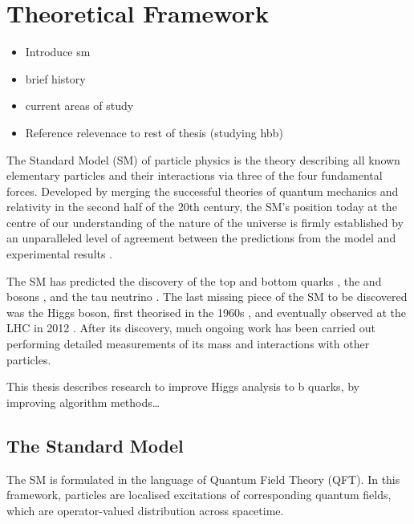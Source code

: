 \chapter{Theoretical Framework}\label{chap:theory}

\begin{itemize}
  \item Introduce sm
  \item brief history
  \item current areas of study
  \item Reference relevenace to rest of thesis (studying hbb)
\end{itemize}

The Standard Model (SM) of particle physics is the theory describing all known elementary particles and their interactions via three of the four fundamental forces.
Developed by merging the successful theories of quantum mechanics and relativity in the second half of the 20th century, the SM's position today at the centre of our understanding of the nature of the universe is firmly established by an unparalleled level of agreement between the predictions from the model and experimental results \cite{morel2020determination,sailer2022measurement}.

The SM has predicted the discovery of the top and bottom quarks \cite{CDF:1995wbb,D0:1995jca,Herb:1977ek}, the \Wboson and \Zboson bosons \cite{UA1:1983crd}, and the tau neutrino \cite{DONUT:2000fbd}.
The last missing piece of the SM to be discovered was the Higgs boson, first theorised in the 1960s \cite{Englert:1964et,Higgs:1964pj,Guralnik:1964eu}, and eventually observed at the LHC in 2012 \cite{HIGG-2012-27,CMS-HIG-12-028}.
After its discovery, much ongoing work has been carried out performing detailed measurements of its mass and interactions with other particles.

This thesis describes research to improve Higgs analysis to b quarks, by improving algorithm methods\dots


\section{The Standard Model}\label{sec:standard_model}

The SM is formulated in the language of Quantum Field Theory (QFT).
In this framework, particles are localised excitations of corresponding quantum fields, which are operator-valued distribution across spacetime.

